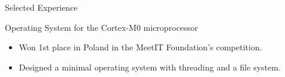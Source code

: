 \documentclass{article}
\newlength{\tabin}
\newlength{\secsep}
\newcommand{\lineunder}{\vspace*{-8pt} \\ \hspace*{-6pt} \hrulefill \\ \vspace*{-15pt}}
\newenvironment{tabbedsection}[1]{
  \begin{list}{}{
      \setlength{\itemsep}{0pt}
      \setlength{\labelsep}{0pt}
      \setlength{\labelwidth}{0pt}
      \setlength{\leftmargin}{\tabin}
      \setlength{\rightmargin}{\tabin}
      \setlength{\listparindent}{0pt}
      \setlength{\parsep}{0pt}
      \setlength{\parskip}{0pt}
      \setlength{\partopsep}{0pt}
      \setlength{\topsep}{#1}
    }
  \item[]
}{\end{list}}
\newenvironment{nospacetabbing}{
    \begin{tabbing}
}{\end{tabbing}\vspace{-1.2em}}
\newenvironment{resume_section}[1]{
  \filbreak
  \vspace{2\secsep}
  \textsc{\large#1}
  \lineunder
  \begin{tabbedsection}{\secsep}
}{\end{tabbedsection}}
\newenvironment{resume_subsection}[2][]{
  \textbf{#2} \hfill {\footnotesize #1}%
  \begin{tabbedsection}{0.5\secsep}
}{\end{tabbedsection}}
\newenvironment{subitems}{
  \renewcommand{\labelitemi}{-}
  \begin{itemize}
      \setlength{\labelsep}{1em}
}{\end{itemize}}
\begin{document}
\begin{resume_section}{Selected Experience}
  \begin{resume_subsection}{Operating System for the Cortex-M0 microprocessor}
    \begin{subitems}
      \item Won 1st place in Poland in the MeetIT Foundation's competition.
      \item Designed a minimal operating system with threading and a file system.
    \end{subitems}
  \end{resume_subsection}

\end{resume_section}


\end{document}
